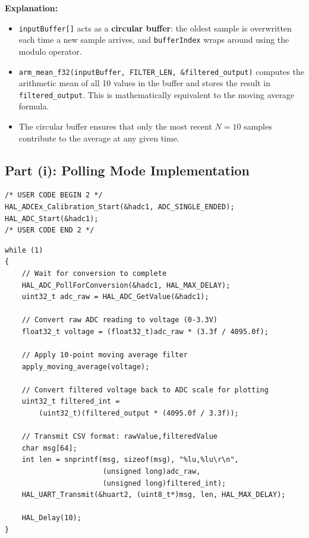 \documentclass[12pt,a4paper]{article}
\begin{document}
\textbf{Explanation:}
\begin{itemize}
    \item \texttt{inputBuffer[]} acts as a \textbf{circular buffer}: the oldest sample is overwritten each time a new sample arrives, and \texttt{bufferIndex} wraps around using the modulo operator.
    \item \texttt{arm\_mean\_f32(inputBuffer, FILTER\_LEN, \&filtered\_output)} computes the arithmetic mean of all 10 values in the buffer and stores the result in \texttt{filtered\_output}. This is mathematically equivalent to the moving average formula.
    \item The circular buffer ensures that only the most recent $N = 10$ samples contribute to the average at any given time.
\end{itemize}

\subsection{Part (i): Polling Mode Implementation}

\begin{lstlisting}[caption=Task 2 -- Polling Mode: Initialisation]
/* USER CODE BEGIN 2 */
HAL_ADCEx_Calibration_Start(&hadc1, ADC_SINGLE_ENDED);
HAL_ADC_Start(&hadc1);
/* USER CODE END 2 */
\end{lstlisting}

\begin{lstlisting}[caption=Task 2 -- Polling Mode: Main Loop]
while (1)
{
    // Wait for conversion to complete
    HAL_ADC_PollForConversion(&hadc1, HAL_MAX_DELAY);
    uint32_t adc_raw = HAL_ADC_GetValue(&hadc1);

    // Convert raw ADC reading to voltage (0-3.3V)
    float32_t voltage = (float32_t)adc_raw * (3.3f / 4095.0f);

    // Apply 10-point moving average filter
    apply_moving_average(voltage);

    // Convert filtered voltage back to ADC scale for plotting
    uint32_t filtered_int =
        (uint32_t)(filtered_output * (4095.0f / 3.3f));

    // Transmit CSV format: rawValue,filteredValue
    char msg[64];
    int len = snprintf(msg, sizeof(msg), "%lu,%lu\r\n",
                       (unsigned long)adc_raw,
                       (unsigned long)filtered_int);
    HAL_UART_Transmit(&huart2, (uint8_t*)msg, len, HAL_MAX_DELAY);

    HAL_Delay(10);
}
\end{lstlisting}
\end{document}
